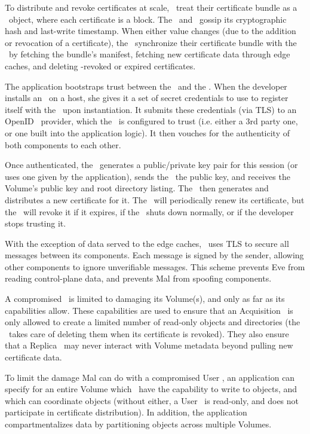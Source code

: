 To distribute and revoke certificates at scale,
\SGs\ treat their certificate bundle as a \Syndicate\ object,
where each certificate is a block.
The \MS\ and \SGs\ gossip its cryptographic hash and last-write timestamp.
When either value changes (due to the addition or revocation
of a certificate), the \SGs\ synchronize their certificate bundle with the \MS\ by
fetching the bundle's manifest, fetching new certificate data through edge caches,
and deleting \MS-revoked or expired certificates.

The application bootstraps trust between the \SG\ and the \MS.
When the developer installs an \SG\ on a host, she gives it a set of secret 
credentials to use to register itself with the \MS\ upon instantiation.  It
submits these credentials (via TLS) to an OpenID~\cite{openid} provider,
which the \MS\ is configured to trust
(i.e. either a 3rd party one, or one built into the application logic).
It then vouches for the authenticity of both components to each other.

Once authenticated, the \SG\ generates a public/private key pair for this
session (or uses one given by the application), sends the \MS\ the public key,
and receives the Volume's public key and root directory listing.
The \MS\ then generates and distributes a new certificate
for it.  The \SG\ will periodically renew its certificate, but the \MS\ will revoke it
if it expires, if the \SG\ shuts down normally, or if the developer stops trusting it.

With the exception of data served to the edge caches, \Syndicate\ uses TLS to 
secure all messages between its components.  Each message is signed by
the sender, allowing other components to ignore unverifiable messages.  This
scheme prevents Eve from reading control-plane data, and prevents Mal from spoofing components.

A compromised \SG\ is limited to damaging its Volume(s), and only as far as 
its capabilities allow.  These capabilities are used to ensure that an Acquisition \SG\
is only allowed to create a limited number of read-only objects and directories
(the \MS\ takes care of deleting them when its certificate is revoked).
They also ensure that a Replica \SG\ may never interact with Volume metadata
beyond pulling new certificate data.

To limit the damage Mal can do with a compromised User \SG, an application can
specify for an entire Volume which \SGs\ have the capability
to write to objects, and which can coordinate objects (without either,
a User \SG\ is read-only, and does not participate in certificate distribution).
In addition, the application compartmentalizes data by partitioning objects across 
multiple Volumes.


